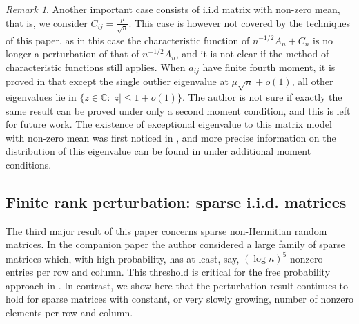 \documentclass[12pt, reqno]{amsart}
\theoremstyle{definition}
\theoremstyle{remark}
\newtheorem{remark}[theorem]{Remark}
\numberwithin{equation}{section}
\begin{document}
\begin{remark} Another important case consists of i.i.d matrix with non-zero mean, that is, we consider $C_{ij}=\frac{\mu}{\sqrt{n}}$. This case is however not covered by the techniques of this paper, as in this case the characteristic function of $n^{-1/2}A_n+C_n$ is no longer a perturbation of that of $n^{-1/2}A_n$, and it is not clear if the method of characteristic functions still applies. When $a_{ij}$ have finite fourth moment, it is proved in \cite{tao2013outliers} that except the single outlier eigenvalue at $\mu\sqrt{n}+o(1)$, all other eigenvalues lie in $\{z\in\mathbb{C}:|z|\leq 1+o(1)\}$. The author is not sure if exactly the same result can be proved under only a second moment condition, and this is left for future work. The existence of exceptional eigenvalue to this matrix model with non-zero mean was first noticed in \cite{andrew1990eigenvalues}, and more precise information on the distribution of this eigenvalue can be found in \cite{silverstein1994spectral} under additional moment conditions.
\end{remark}


\subsection{Finite rank perturbation: sparse i.i.d. matrices}
The third major result of this paper concerns sparse non-Hermitian random matrices. In the companion paper \cite{han2024outliers} the author considered a large family of sparse matrices which, with high probability, has at least, say, $(\log n)^5$ nonzero entries per row and column. This threshold is critical for the free probability approach in \cite{han2024outliers}.
In contrast, we show here that the perturbation result continues to hold for sparse matrices with constant, or very slowly growing, number of nonzero elements per row and column.
\end{document}
